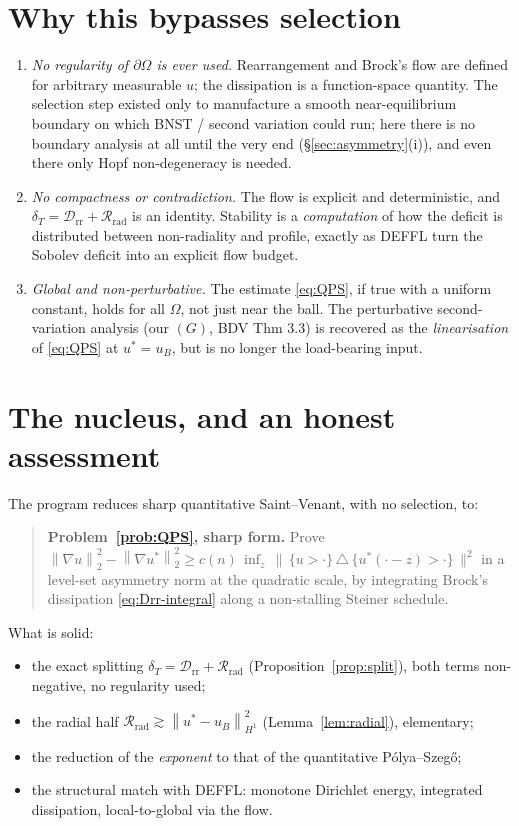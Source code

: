 \documentclass[11pt]{article}
\theoremstyle{definition}
\newcommand{\Om}{\Omega}
\newcommand{\Drr}{\mathcal D_{\mathrm{rr}}}
\newcommand{\Rrad}{\mathcal R_{\mathrm{rad}}}
\newcommand{\dT}{\delta_T}
\newcommand{\norm}[1]{\left\|#1\right\|}
\begin{document}
\section{Why this bypasses selection}

\begin{enumerate}[label=\textup{(\arabic*)},leftmargin=2em]
\item \emph{No regularity of $\partial\Om$ is ever used.} Rearrangement and
Brock's flow are defined for arbitrary measurable $u$; the dissipation is a
function-space quantity. The selection step existed only to manufacture a
smooth near-equilibrium boundary on which BNST / second variation could run;
here there is no boundary analysis at all until the very end
(\S\ref{sec:asymmetry}(i)), and even there only Hopf non-degeneracy is
needed.
\item \emph{No compactness or contradiction.} The flow is explicit and
deterministic, and $\dT=\Drr+\Rrad$ is an identity. Stability is a
\emph{computation} of how the deficit is distributed between non-radiality
and profile, exactly as DEFFL turn the Sobolev deficit into an explicit flow
budget.
\item \emph{Global and non-perturbative.} The estimate \eqref{eq:QPS}, if
true with a uniform constant, holds for all $\Om$, not just near the ball.
The perturbative second-variation analysis (our $(G)$, BDV Thm 3.3) is
recovered as the \emph{linearisation} of \eqref{eq:QPS} at $u^*=u_B$, but is
no longer the load-bearing input.
\end{enumerate}

\section{The nucleus, and an honest assessment}

The program reduces sharp quantitative Saint--Venant, with no selection, to:

\begin{quote}
\textbf{Problem~\ref{prob:QPS}, sharp form.} Prove
$\norm{\nabla u}_2^2-\norm{\nabla u^*}_2^2\ge c(n)\,\inf_z\,\big\|\,
\{u>\cdot\}\,\triangle\,\{u^*(\cdot-z)>\cdot\}\,\big\|^2$ in a level-set
asymmetry norm at the quadratic scale, by integrating Brock's dissipation
\eqref{eq:Drr-integral} along a non-stalling Steiner schedule.
\end{quote}

What is solid:
\begin{itemize}[leftmargin=2em]
\item the exact splitting $\dT=\Drr+\Rrad$ (Proposition~\ref{prop:split}),
both terms non-negative, no regularity used;
\item the radial half $\Rrad\gtrsim\norm{u^*-u_B}^2_{H^1}$
(Lemma~\ref{lem:radial}), elementary;
\item the reduction of the \emph{exponent} to that of the quantitative
Pólya--Szegő;
\item the structural match with DEFFL: monotone Dirichlet energy, integrated
dissipation, local-to-global via the flow.
\end{itemize}
\end{document}
